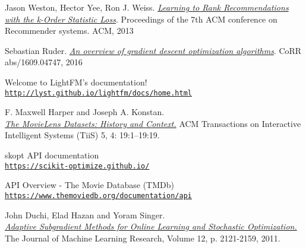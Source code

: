 \begin{thebibliography}{9}
	\hypertarget{jasonkos}{} 
	Jason Weston, Hector Yee, Ron J. Weiss.
	\textit{\href{https://static.googleusercontent.com/media/research.google.com/ro//pubs/archive/41534.pdf}{Learning to Rank Recommendations
with the k-Order Statistic Loss}}.
	Proceedings of the 7th ACM conference on Recommender systems. ACM, 2013
	
	\hypertarget{ruder2016}{} 
	Sebastian Ruder.
	\textit{\href{http://arxiv.org/abs/1609.04747}{An overview of gradient descent optimization algorithms}}.
	CoRR abs/1609.04747, 2016
	
	\hypertarget{lightfm}{} 
	Welcome to LightFM’s documentation!
	\\\texttt{\url{http://lyst.github.io/lightfm/docs/home.html}}
	
	\hypertarget{movielens}{} 
	F. Maxwell Harper and Joseph A. Konstan.
	\\\textit{\href{https://doi.org/10.1145/2827872}{The MovieLens Datasets: History and Context.}}
	ACM Transactions on Interactive Intelligent Systems (TiiS) 5, 4: 19:1–19:19.
	
	\hypertarget{skopt}{} 
	skopt API documentation
	\\\texttt{\url{https://scikit-optimize.github.io/}}
	
	\hypertarget{themoviedb}{} 
	API Overview - The Movie Database (TMDb)
	\\\texttt{\url{https://www.themoviedb.org/documentation/api}}
	
	\hypertarget{adagrad}{} 
	John Duchi, Elad Hazan and Yoram Singer.
	\\\textit{\href{http://jmlr.org/papers/v12/duchi11a.html}{Adaptive Subgradient Methods for Online Learning and Stochastic Optimization.}}
	The Journal of Machine Learning Research, Volume 12, p. 2121-2159, 2011.
\end{thebibliography}
